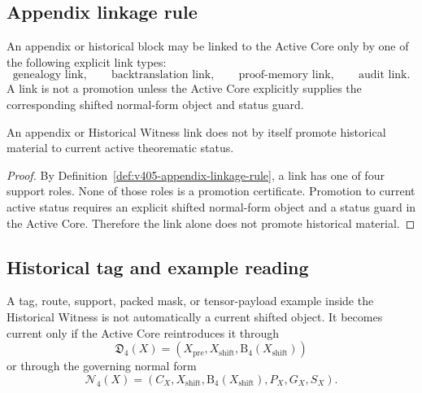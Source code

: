 \subsection{Appendix linkage rule}
\label{subsec:v405-appendix-linkage-rule}

\begin{definition}
\label{def:v405-appendix-linkage-rule}
An appendix or historical block may be linked to the Active Core only by one of
the following explicit link types:
\[
 \text{genealogy link},\qquad
 \text{backtranslation link},\qquad
 \text{proof-memory link},\qquad
 \text{audit link}.
\]
A link is not a promotion unless the Active Core explicitly supplies the
corresponding shifted normal-form object and status guard.
\end{definition}

\begin{proposition}
\label{prop:v405-appendix-links-are-not-promotions}
An appendix or Historical Witness link does not by itself promote historical
material to current active theorematic status.
\end{proposition}

\begin{proof}
By Definition~\ref{def:v405-appendix-linkage-rule}, a link has one of four
support roles. None of those roles is a promotion certificate. Promotion to
current active status requires an explicit shifted normal-form object and a status
guard in the Active Core. Therefore the link alone does not promote historical
material.
\end{proof}

\subsection{Historical tag and example reading}
\label{subsec:v405-historical-tag-example-reading}

\begin{definition}
\label{def:v405-historical-tag-reading}
A tag, route, support, packed mask, or tensor-payload example inside the
Historical Witness is not automatically a current shifted object. It becomes
current only if the Active Core reintroduces it through
\[
 \mathfrak D_4(X)
 =
 (X_{\mathrm{pre}},X_{\mathrm{shift}},\mathrm B_4(X_{\mathrm{shift}}))
\]
or through the governing normal form
\[
 \mathcal N_4(X)
 =
 (C_X,X_{\mathrm{shift}},\mathrm B_4(X_{\mathrm{shift}}),P_X,G_X,S_X).
\]
\end{definition}

